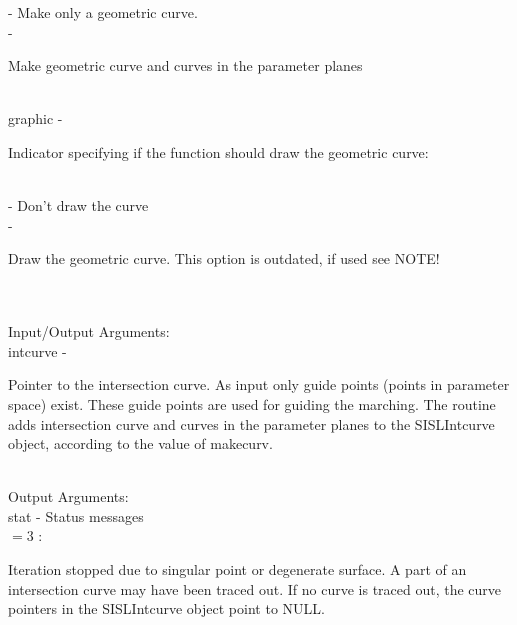                 \>\>\>\> -     \>Make only a geometric curve.\\
                \>\>\>\> -     \>\begin{minipg5}
                                        Make geometric curve and curves in the parameter
                                        planes
                                        \end{minipg5} \\[0.3ex]
        \>\>    {\fov graphic}\> - \>   \begin{minipg2}
                                Indicator specifying if the function
                                should draw the geometric curve:
                                \end{minipg2}\\
                \>\>\>\> -     \>Don't draw the curve\\
                \>\>\>\> -     \>\begin{minipg5}
                                        Draw the geometric curve. This option is
                                        outdated, if used see NOTE!
                                        \end{minipg5} \\[0.8ex]
\\ %
        \>Input/Output Arguments:\\
        \>\>    {\fov intcurve}\> - \>  \begin{minipg2}
                                Pointer to the intersection curve.
                                As input only
                                guide points (points in parameter space)
                                exist. These guide points
                                are used for guiding the marching.
                                The routine adds
                                intersection curve and curves in the parameter
                                planes to the SISLIntcurve object, according to the value
                                of makecurv.
                                \end{minipg2}\\
\newpagetabs
        \>Output Arguments:\\
        \>\>    {\fov stat}     \> - \> Status messages\\
                \>\>\>\>\>              $= 3$ : \>      \begin{minipg5}
                                                        Iteration stopped due to singular
                                                        point or degenerate surface. A part of an
                                                        intersection curve may have been
                                                        traced out. If no curve is traced out,
                                                        the curve pointers in the SISLIntcurve
                                                        object point to NULL.
                                                        \end{minipg5} \\[0.3ex]
